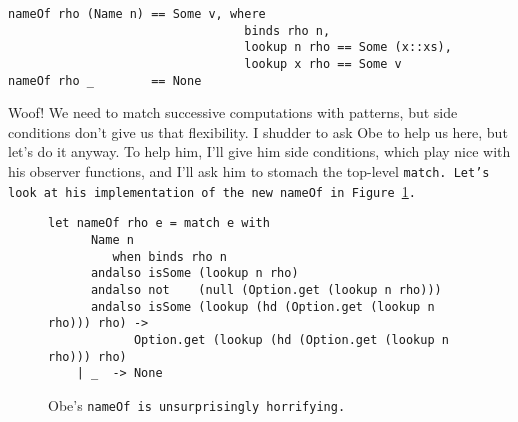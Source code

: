 \documentclass[manuscript,screen,review, 12pt]{acmart}
\begin{document}
\begin{outline}[enumerate]
    \begin{minipage}[t]{\textwidth}
        \centering 
        \begin{verbatim}
nameOf rho (Name n) == Some v, where 
                                 binds rho n, 
                                 lookup n rho == Some (x::xs),
                                 lookup x rho == Some v
nameOf rho _        == None 
        \end{verbatim}
    \end{minipage}




    
    

    Woof! We need to match successive computations with patterns, but side
    conditions don't give us that flexibility. I shudder to ask Obe to help us
    here, but let's do it anyway. To help him, I'll give him side conditions,
    which play nice with his observer functions, and I'll ask him to stomach the
    top-level \tt{match}. Let's look at his implementation of the new
    \tt{nameOf} in Figure~\ref{fig:obenameof}.

    \begin{figure}[ht]
        \begin{verbatim}
let nameOf rho e = match e with     
      Name n   
         when binds rho n 
      andalso isSome (lookup n rho) 
      andalso not    (null (Option.get (lookup n rho))) 
      andalso isSome (lookup (hd (Option.get (lookup n rho))) rho) ->
            Option.get (lookup (hd (Option.get (lookup n rho))) rho)
    | _  -> None
            \end{verbatim}
        \caption{Obe's \tt{nameOf} is unsurprisingly horrifying.}
        \label{fig:obenameof}
    \end{figure}


\end{outline}
\end{document}

